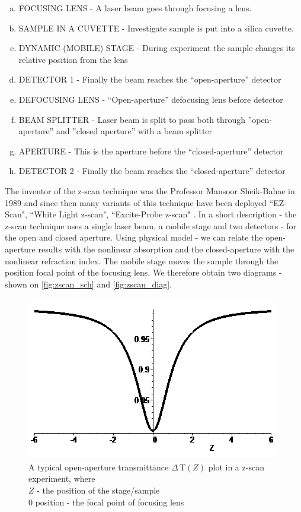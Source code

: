 \documentclass[12pt,twoside,a4paper]{article}
\numberwithin{equation}{subsection}
\numberwithin{figure}{subsection}
\begin{document}
\begin{enumerate}[(a)]
  \item FOCUSING LENS - A laser beam goes through focusing a lens.
  \item SAMPLE IN A CUVETTE - Investigate sample is put into a silica cuvette.
  \item DYNAMIC (MOBILE) STAGE - During experiment the sample changes its relative position from the lens
  \item DETECTOR 1 - Finally the beam reaches the ``open-aperture'' detector  
  \item DEFOCUSING LENS  - ``Open-aperture'' defocusing lens before detector
  \item BEAM SPLITTER - Laser beam is split to pass both through ''open-aperture'' and ''closed aperture'' with a beam splitter
  \item APERTURE - This is the aperture before the ``closed-aperture'' detector
  \item DETECTOR 2 - Finally the beam reaches the ``closed-aperture'' detector
\end{enumerate}


The inventor of the z-scan technique was the Professor Mansoor Sheik-Bahae in 1989 \cite{bahae_sensitive} and since then many variants of this
technique have been deployed ``EZ-Scan", ``White Light z-scan", ``Excite-Probe z-scan" \cite{newport_application}. In a short
description - the z-scan technique uses a single laser beam, a mobile stage and two detectors - for the open and closed aperture.
Using physical model - we can relate the open-aperture results with the nonlinear absorption and the closed-aperture with the
nonlinear refraction index. The mobile stage moves the sample through the position focal point of the focusing lens. We therefore obtain
two diagrams - shown on \ref{fig:zscan_sch} and \ref{fig:zscan_diag}.


\begin{figure}
  \includegraphics{img/oa_plot.png}
  \caption{A typical open-aperture transmittance $\Delta \,\mathrm{T}(Z)$ plot in a z-scan experiment, where \\ 
  $Z$ - the position of the stage/sample \\ 
  $0$ position - the focal point of focusing lens 
  \label{fig:oa_plot}}
\end{figure}
\end{document}
